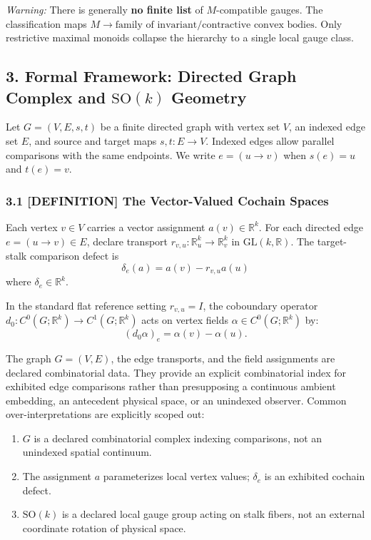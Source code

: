 \documentclass[
  11pt,
]{article}
\begin{document}
\emph{Warning:} There is generally \textbf{no finite list} of
\(M\)-compatible gauges. The classification maps
\(M \to \text{family of invariant/contractive convex bodies}\). Only
restrictive maximal monoids collapse the hierarchy to a single local
gauge class.

\subsection{\texorpdfstring{3. Formal Framework: Directed Graph Complex
and \(\mathrm{SO}(k)\)
Geometry}{3. Formal Framework: Directed Graph Complex and \textbackslash mathrm\{SO\}(k) Geometry}}\label{formal-framework-directed-graph-complex-and-mathrmsok-geometry}

Let \(G = (V, E, s, t)\) be a finite directed graph with vertex set
\(V\), an indexed edge set \(E\), and source and target maps
\(s,t:E\to V\). Indexed edges allow parallel comparisons with the same
endpoints. We write \(e=(u\to v)\) when \(s(e)=u\) and \(t(e)=v\).

\subsubsection{\texorpdfstring{3.1 \textbf{{[}DEFINITION{]}} The
Vector-Valued Cochain
Spaces}{3.1 {[}DEFINITION{]} The Vector-Valued Cochain Spaces}}\label{definition-the-vector-valued-cochain-spaces}

Each vertex \(v \in V\) carries a vector assignment
\(a(v) \in \mathbb{R}^k\). For each directed edge
\(e = (u \to v) \in E\), declare transport
\(r_{v,u}:\mathbb R^k_u\to\mathbb R^k_v\) in
\(\mathrm{GL}(k,\mathbb R)\). The target-stalk comparison defect is
\[\delta_e(a) = a(v) - r_{v,u}a(u)\] where
\(\delta_e \in \mathbb{R}^k\).

In the standard flat reference setting \(r_{v,u} = I\), the coboundary
operator \(d_0: C^0(G; \mathbb{R}^k) \to C^1(G; \mathbb{R}^k)\) acts on
vertex fields \(\alpha \in C^0(G; \mathbb{R}^k)\) by:
\[(d_0 \alpha)_e = \alpha(v) - \alpha(u).\]

The graph \(G = (V, E)\), the edge transports, and the field assignments
are declared combinatorial data. They provide an explicit combinatorial
index for exhibited edge comparisons rather than presupposing a
continuous ambient embedding, an antecedent physical space, or an
unindexed observer. Common over-interpretations are explicitly scoped
out:

\begin{enumerate}
\def\labelenumi{\arabic{enumi}.}
\item
  \(G\) is a declared combinatorial complex indexing comparisons, not an
  unindexed spatial continuum.
\item
  The assignment \(a\) parameterizes local vertex values; \(\delta_e\)
  is an exhibited cochain defect.
\item
  \(\mathrm{SO}(k)\) is a declared local gauge group acting on stalk
  fibers, not an external coordinate rotation of physical space.
\end{enumerate}
\end{document}

